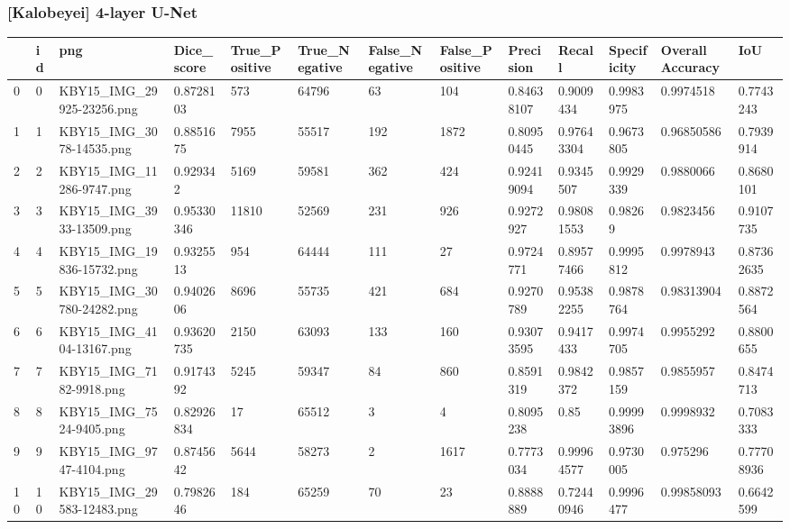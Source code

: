 \documentclass[11pt, a4paper, twoside]{report}
\begin{document}
\subsubsection{[Kalobeyei] 4-layer U-Net}

\begin{longtable}[c]{@{}lllllllllllll@{}}
\tiny
\toprule
 & id & png & Dice\_score & True\_Positive & True\_Negative & False\_Negative & False\_Positive & Precision & Recall & Specificity & Overall Accuracy & IoU \\* \midrule
\endhead
%
\bottomrule
\endfoot
%
\endlastfoot
%
0 & 0 & KBY15\_IMG\_29925-23256.png & 0.8728103 & 573 & 64796 & 63 & 104 & 0.84638107 & 0.9009434 & 0.9983975 & 0.9974518 & 0.7743243 \\
1 & 1 & KBY15\_IMG\_3078-14535.png & 0.8851675 & 7955 & 55517 & 192 & 1872 & 0.80950445 & 0.97643304 & 0.9673805 & 0.96850586 & 0.7939914 \\
2 & 2 & KBY15\_IMG\_11286-9747.png & 0.929342 & 5169 & 59581 & 362 & 424 & 0.92419094 & 0.9345507 & 0.9929339 & 0.9880066 & 0.8680101 \\
3 & 3 & KBY15\_IMG\_3933-13509.png & 0.95330346 & 11810 & 52569 & 231 & 926 & 0.9272927 & 0.98081553 & 0.98269 & 0.9823456 & 0.9107735 \\
4 & 4 & KBY15\_IMG\_19836-15732.png & 0.9325513 & 954 & 64444 & 111 & 27 & 0.9724771 & 0.89577466 & 0.9995812 & 0.9978943 & 0.87362635 \\
5 & 5 & KBY15\_IMG\_30780-24282.png & 0.9402606 & 8696 & 55735 & 421 & 684 & 0.9270789 & 0.95382255 & 0.9878764 & 0.98313904 & 0.8872564 \\
6 & 6 & KBY15\_IMG\_4104-13167.png & 0.93620735 & 2150 & 63093 & 133 & 160 & 0.93073595 & 0.9417433 & 0.9974705 & 0.9955292 & 0.8800655 \\
7 & 7 & KBY15\_IMG\_7182-9918.png & 0.9174392 & 5245 & 59347 & 84 & 860 & 0.8591319 & 0.9842372 & 0.9857159 & 0.9855957 & 0.8474713 \\
8 & 8 & KBY15\_IMG\_7524-9405.png & 0.82926834 & 17 & 65512 & 3 & 4 & 0.8095238 & 0.85 & 0.99993896 & 0.9998932 & 0.7083333 \\
9 & 9 & KBY15\_IMG\_9747-4104.png & 0.8745642 & 5644 & 58273 & 2 & 1617 & 0.7773034 & 0.99964577 & 0.9730005 & 0.975296 & 0.77708936 \\
10 & 10 & KBY15\_IMG\_29583-12483.png & 0.7982646 & 184 & 65259 & 70 & 23 & 0.8888889 & 0.72440946 & 0.9996477 & 0.99858093 & 0.6642599 \\

\end{longtable}
\end{document}

